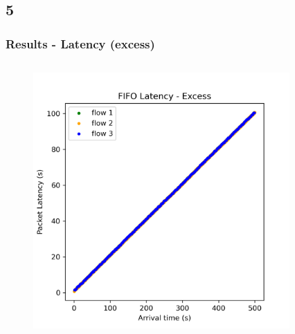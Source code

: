 \documentclass[compress]{beamer}
\begin{document}
    \subsection{5}
    \begin{frame}
        \frametitle{Results - Latency (excess)}
        \begin{columns}
            \begin{column}{0.32\textwidth}
                \begin{figure}
                    \centering
                    \includegraphics[width=\textwidth]{../img/fifo_excess}
                \end{figure}
            \end{column}
            \begin{column}{0.32\textwidth}
                \begin{figure}
                    \centering

\end{figure}
\end{column}
\end{columns}
\end{frame}
\end{document}
